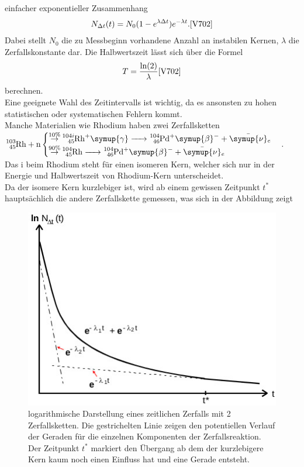 einfacher exponentieller Zusammenhang
\begin{align}
    N_{\Delta t} (t) = N_0 (1-e^{\lambda \Delta t}) e^{- \lambda t}. \text{\cite{V702}} \label{eq:5} 
\end{align}
Dabei stellt $N_0$ die zu Messbeginn vorhandene Anzahl an instabilen Kernen, $\lambda$ die Zerfallskonstante dar.
Die Halbwertszeit lässt sich über die Formel
\begin{align}
    T=\frac{\ln(2)}{\lambda} \text{\cite{V702}} \label{eq:6}
\end{align}
berechnen.\\
Eine geeignete Wahl des Zeitintervalls ist wichtig, da es ansonsten zu hohen
statistischen oder systematischen Fehlern kommt.\\
Manche Materialien wie Rhodium haben zwei Zerfallsketten\\
$\ce{^{103}_{45}Rh + n}  
\begin{cases}
    \ce{\stackrel{10\%}{\to} ^{104i}_{45}Rh+\symup{\gamma} -> ^{104}_{46}Pd+\symup{\beta}^- + \bar{\symup{\nu}}_e }\\
    \ce{\stackrel{90\%}{\to} ^{104}_{45}Rh ->  ^{104}_{46}Pd+\symup{\beta}^- + \bar{\symup{\nu}}_e }
\end{cases}.
$
Das i beim Rhodium steht für einen isomeren Kern, welcher sich nur in der Energie und
Halbwertszeit von Rhodium-Kern unterscheidet.\\
Da der isomere Kern kurzlebiger ist, wird ab einem gewissen Zeitpunkt $t^*$ hauptsächlich
die andere Zerfallskette gemessen, was sich in der Abbildung zeigt
\begin{figure}
    \centering
    \includegraphics[width=\linewidth]{images/Rh_theo.jpg}
    \caption{logarithmische Darstellung eines zeitlichen Zerfalls mit
    2 Zerfallsketten\cite{V702}.
    Die gestrichelten Linie zeigen den potentiellen Verlauf der Geraden für die 
    einzelnen Komponenten der Zerfallsreaktion. Der Zeitpunkt $t^*$ markiert den Übergang ab
    dem der kurzlebigere Kern kaum noch einen Einfluss hat und eine Gerade entsteht.
    }
    \label{fig:2}
\end{figure}


